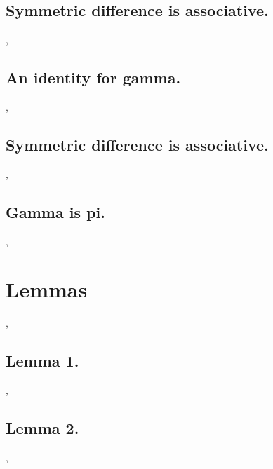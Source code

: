 \documentclass[preview]{standalone}
\begin{document}
\subsection{Symmetric difference is associative.}

\sep
\pagebreak


\subsection{An identity for gamma.}

\sep
\pagebreak


\subsection{Symmetric difference is associative.}

\sep
\pagebreak

\subsection{Gamma is pi.}

\sep
\pagebreak


\section{Lemmas}
\sep


\subsection{Lemma 1.}

\sep
\pagebreak


\subsection{Lemma 2.}

\sep
\end{document}
